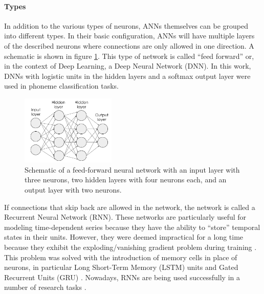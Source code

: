             \paragraph{Types} In addition to the various types of neurons, ANNs themselves can be grouped into different types. 
            In their basic configuration, ANNs will have multiple layers of the described neurons where connections are only allowed in one direction. 
            A schematic is shown in figure \ref{fig:feedforward}. 
            This type of network is called ``feed forward'' or, in the context of Deep Learning, a Deep Neural Network (DNN). 
            In this work, DNNs with logistic units in the hidden layers and a softmax output layer were used in phoneme classification tasks.

            \begin{figure}[htbp]
                \centering
                \includegraphics[width=0.4\textwidth]{figures/feedforward.png}
                \caption{Schematic of a feed-forward neural network with an input layer with three neurons, two hidden layers with four neurons each, and an output layer with two neurons. \cite{medium}}
                \label{fig:feedforward}
            \end{figure}

            If connections that skip back are allowed in the network, the network is called a Recurrent Neural Network (RNN). 
            These networks are particularly useful for modeling time-dependent series because they have the ability to ``store'' temporal states in their units. 
            However, they were deemed impractical for a long time because they exhibit the exploding/vanishing gradient problem during training \cite{Hochreiter1998}. 
            This problem was solved with the introduction of memory cells in place of neurons, in particular Long Short-Term Memory (LSTM) units \cite{Hochreiter1997} and Gated Recurrent Units (GRU) \cite{Cho2014}. 
            Nowadays, RNNs are being used successfully in a number of research tasks \cite{lstm_sak_senior}.

